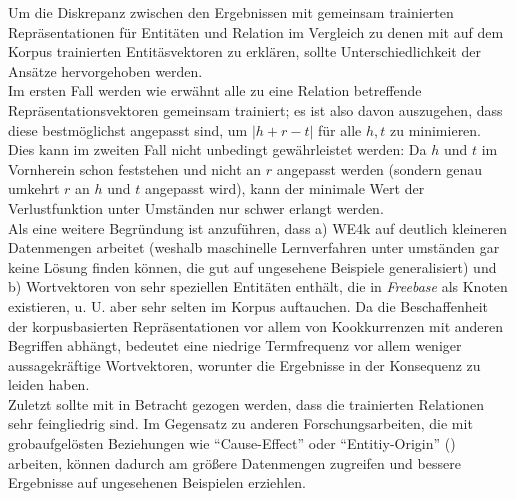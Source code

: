 Um die Diskrepanz zwischen den Ergebnissen mit gemeinsam trainierten Repräsentationen für Entitäten und Relation im Vergleich
zu denen mit auf dem Korpus trainierten Entitäsvektoren zu erklären, sollte Unterschiedlichkeit der Ansätze hervorgehoben
werden.\\
Im ersten Fall werden wie erwähnt alle zu eine Relation betreffende Repräsentationsvektoren gemeinsam trainiert; es ist
also davon auszugehen, dass diese bestmöglichst angepasst sind, um $|h + r - t|$ für alle $h, t$ zu minimieren.\\
Dies kann im zweiten Fall nicht unbedingt gewährleistet werden: Da $h$ und $t$ im Vornherein schon feststehen und nicht
an $r$ angepasst werden (sondern genau umkehrt $r$ an $h$ und $t$ angepasst wird), kann der minimale Wert der Verlustfunktion
unter Umständen nur schwer erlangt werden.\\
Als eine weitere Begründung ist anzuführen, dass a) WE4k auf deutlich kleineren Datenmengen arbeitet (weshalb maschinelle
Lernverfahren unter umständen gar keine Lösung finden können, die gut auf ungesehene Beispiele generalisiert) und b)
Wortvektoren von sehr speziellen Entitäten enthält, die in \emph{Freebase} als Knoten existieren, u. U. aber sehr selten
im Korpus auftauchen. Da die Beschaffenheit der korpusbasierten Repräsentationen vor allem von Kookkurrenzen mit anderen
Begriffen abhängt, bedeutet eine niedrige Termfrequenz vor allem weniger aussagekräftige Wortvektoren, worunter die
Ergebnisse in der Konsequenz zu leiden haben.\\
Zuletzt sollte mit in Betracht gezogen werden, dass die trainierten Relationen sehr feingliedrig sind. Im Gegensatz zu
anderen Forschungsarbeiten, die mit grobaufgelösten Beziehungen wie ``Cause-Effect'' oder ``Entitiy-Origin''
(\cite{hendrickx2009semeval}) arbeiten, können dadurch am größere Datenmengen zugreifen und bessere Ergebnisse auf
ungesehenen Beispielen erziehlen.
